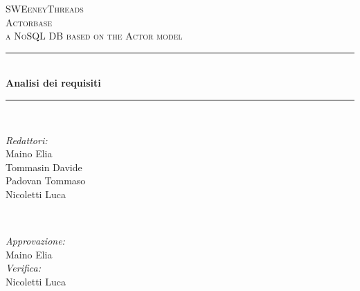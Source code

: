 \documentclass[a4paper]{article}
\begin{document}
	
	\begin{titlepage}
		\newcommand{\HRule}{\rule{\linewidth}{0.5mm}} 
		\center  
		
		\textsc{\LARGE SWEeneyThreads}\\[1.5cm] 
		\textsc{\Large Actorbase}\\[0.5cm] 
		\textsc{\large a NoSQL DB based on the Actor model}\\[0.5cm]
		
		
		\HRule \\[0.4cm]
		{ \huge \bfseries Analisi dei requisiti}\\[0.4cm] 
		\HRule \\[1.5cm]
		
		\begin{minipage}{0.4\textwidth}
			\begin{flushleft} \large
				\emph{Redattori:}\\
				Maino Elia \\
				Tommasin Davide \\
                Padovan Tommaso \\
				Nicoletti Luca
			\end{flushleft}
		\end{minipage}
		~
		\begin{minipage}{0.4\textwidth}
			\begin{flushright} \large
				\emph{Approvazione:} \\
				Maino Elia \\
				\emph{Verifica:} \\
                Nicoletti Luca
			\end{flushright}
		\end{minipage}
		

\end{titlepage}
\end{document}
